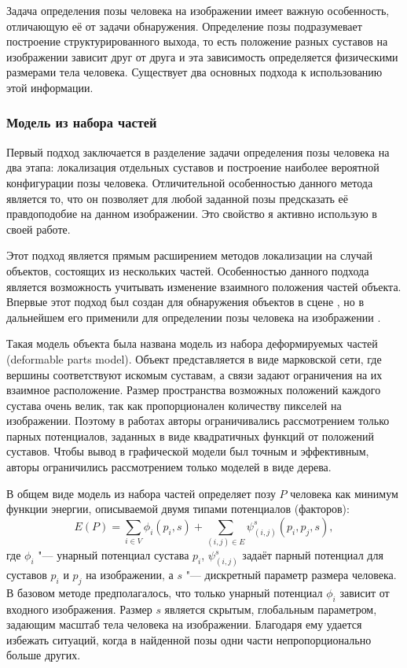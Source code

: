 Задача определения позы человека на изображении имеет важную особенность, отличающую её от задачи обнаружения. Определение позы подразумевает построение структурированного выхода, то есть положение разных суставов на изображении зависит друг от друга и эта зависимость определяется физическими размерами тела человека. Существует два основных подхода к использованию этой информации.

\subsubsection{Модель из набора частей}

Первый подход заключается в разделение задачи определения позы человека на два этапа: локализация отдельных суставов и построение наиболее вероятной конфигурации позы человека. Отличительной особенностью данного метода является то, что он позволяет для любой заданной позы предсказать её правдоподобие на данном изображении. Это свойство я активно использую в своей работе.

Этот подход является прямым расширением методов локализации на случай объектов, состоящих из нескольких частей. Особенностью данного подхода является возможность учитывать изменение взаимного положения частей объекта. Впервые этот подход был создан для обнаружения объектов в сцене \cite{felzenszwalb2008discriminatively}, но в дальнейшем его применили для определении позы человека на изображении \cite{yang2011articulated}.

Такая модель объекта была названа модель из набора деформируемых частей (deformable parts model). Объект представляется в виде марковской сети, где вершины соответствуют искомым суставам, а связи задают ограничения на их взаимное расположение. Размер пространства возможных положений каждого сустава очень велик, так как пропорционален количеству пикселей на изображении. Поэтому в работах \cite{yang2011articulated,pirsiavash2012steerable} авторы ограничивались рассмотрением только парных потенциалов, заданных в виде квадратичных функций от положений суставов. Чтобы вывод в графической модели был точным и эффективным, авторы ограничились рассмотрением только моделей в виде дерева.

В общем виде модель из набора частей определяет позу $P$ человека как минимум функции энергии, описываемой двумя типами потенциалов (факторов):
\begin{equation}
	E(P) = \sum_{i\in V}{\phi_i(p_i, s)} + \sum_{\left(i,j\right)\in E}{\psi_{(i,j)}^s(p_i, p_j, s)},
	\label{eq::rel::im_pose}
\end{equation} 
где $\phi_i$ "--- унарный потенциал сустава $p_i$, $\psi_{(i,j)}^s$ задаёт парный потенциал для суставов $p_i$ и $p_j$ на изображении, а $s$ "--- дискретный параметр размера человека. В базовом методе предполагалось, что только унарный потенциал $\phi_i$ зависит от входного изображения. Размер $s$ является скрытым, глобальным параметром, задающим масштаб тела человека на изображении. Благодаря ему удается избежать ситуаций, когда в найденной позы одни части непропорционально больше других.

